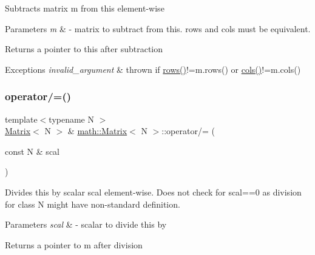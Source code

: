 Subtracts matrix {\ttfamily m} from {\ttfamily this} element-\/wise 
\begin{DoxyParams}{Parameters}
{\em m} & -\/ matrix to subtract from {\ttfamily this}. rows and cols must be equivalent. \\
\hline
\end{DoxyParams}
\begin{DoxyReturn}{Returns}
a pointer to {\ttfamily this} after subtraction 
\end{DoxyReturn}

\begin{DoxyExceptions}{Exceptions}
{\em invalid\+\_\+argument} & thrown if {\ttfamily \hyperlink{classmath_1_1Matrix_a602173645d806afe305ed77b1ff38273}{rows()}!=m.\+rows()} or {\ttfamily \hyperlink{classmath_1_1Matrix_ad78b49e12a607856df124a18a855aaf1}{cols()}!=m.\+cols()} \\
\hline
\end{DoxyExceptions}
\mbox{\label{classmath_1_1Matrix_a1145a22a8fa63ae3b8901184dd665e3a}} 
\subsubsection{\texorpdfstring{operator/=()}{operator/=()}}
{\footnotesize\ttfamily template$<$typename N $>$ \\
\hyperlink{classmath_1_1Matrix}{Matrix}$<$ N $>$ \& \hyperlink{classmath_1_1Matrix}{math\+::\+Matrix}$<$ N $>$\+::operator/= (\begin{DoxyParamCaption}\item[{const N \&}]{scal }\end{DoxyParamCaption})}

Divides {\ttfamily this} by scalar {\ttfamily scal} element-\/wise. Does not check for {\ttfamily scal==0} as division for class {\ttfamily N} might have non-\/standard definition. 
\begin{DoxyParams}{Parameters}
{\em scal} & -\/ scalar to divide {\ttfamily this} by \\
\hline
\end{DoxyParams}
\begin{DoxyReturn}{Returns}
a pointer to {\ttfamily m} after division 
\end{DoxyReturn}
\mbox{\label{classmath_1_1Matrix_a8bf5d371b703ef3023742c4058f709a7}} 
